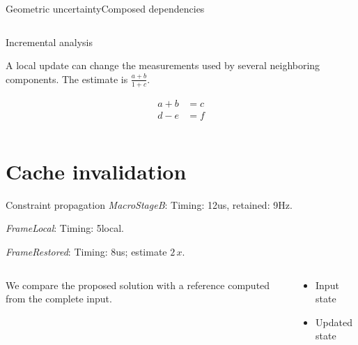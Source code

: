 \documentclass[12pt,aspectratio=43]{beamer}
\newcommand{\fuzzlayerA}[1]{\textbf{#1}}
\newcommand{\fuzzlayerB}[1]{\fuzzlayerA{#1}}
\newcommand{\fuzzlayerC}[1]{\fuzzlayerB{#1}}
\newcommand{\fuzzterm}[1]{\fuzzlayerC{#1}}
\newcommand{\fuzzpair}[2]{\fuzzterm{#1}: #2}
\newcommand{\fuzzunit}{Hz}
\let\fuzzoriginalunit\fuzzunit
\newcommand{\fuzzcoefficient}{2}
\newcommand{\fuzzscale}[2][\fuzzcoefficient]{#1\,#2}
\begin{document}
\begin{frame}[t,shrink=5]{Geometric uncertainty}{Composed dependencies}
{\begin{columns}[onlytextwidth,T]
\begin{column}{0.58\textwidth}
\begin{alertblock}{Incremental analysis}
\begin{description}
\item<1->[Stage 1] \textrm{A local update} can change the measurements used by several neighboring components.  The estimate is $\frac{a+b}{1+c}$.
\item<2->[Stage 2] \[\begin{aligned}a+b&=c\\ d-e&=f\end{aligned}\]
\end{description}
\end{alertblock}
\end{column}
\end{columns}}
\par {}
\end{frame}
\renewcommand{\fuzzunit}{us}
\renewcommand{\fuzzcoefficient}{2}
\renewcommand{\fuzzterm}[1]{{\textit{#1}}}
\section{Cache invalidation}
\begin{frame}[t]{Constraint propagation}
\fuzzpair{MacroStageB}{Timing: 12\fuzzunit, retained: 9\fuzzoriginalunit.}\par
{\renewcommand{\fuzzunit}{local}\fuzzpair{FrameLocal}{Timing: 5\fuzzunit.}\par}
\fuzzpair{FrameRestored}{Timing: 8\fuzzunit; estimate $\fuzzscale{x}$.}\par
\begin{columns}[T]\begin{column}{.46\textwidth}We compare the proposed solution with a reference computed from the complete input.\end{column}\begin{column}{.46\textwidth}\begin{itemize}\item Input state\item Updated state\end{itemize}\end{column}\end{columns}
\end{frame}
\renewcommand{\fuzzunit}{s}
\renewcommand{\fuzzcoefficient}{3}
\renewcommand{\fuzzterm}[1]{{\textrm{#1}}}
\end{document}
